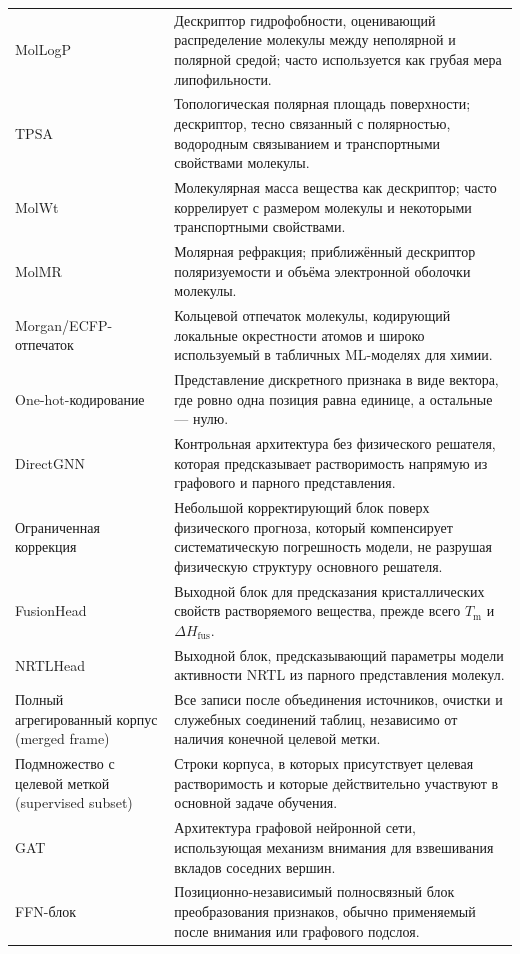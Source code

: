 \documentclass[11pt]{article}
\begin{document}
\begin{longtable}{p{}p{}}
MolLogP & Дескриптор гидрофобности, оценивающий распределение молекулы между неполярной и полярной средой; часто используется как грубая мера липофильности. \\
TPSA & Топологическая полярная площадь поверхности; дескриптор, тесно связанный с полярностью, водородным связыванием и транспортными свойствами молекулы. \\
MolWt & Молекулярная масса вещества как дескриптор; часто коррелирует с размером молекулы и некоторыми транспортными свойствами. \\
MolMR & Молярная рефракция; приближённый дескриптор поляризуемости и объёма электронной оболочки молекулы. \\
Morgan/ECFP-отпечаток & Кольцевой отпечаток молекулы, кодирующий локальные окрестности атомов и широко используемый в табличных ML-моделях для химии. \\
One-hot-кодирование & Представление дискретного признака в виде вектора, где ровно одна позиция равна единице, а остальные --- нулю. \\
DirectGNN & Контрольная архитектура без физического решателя, которая предсказывает растворимость напрямую из графового и парного представления. \\
Ограниченная коррекция & Небольшой корректирующий блок поверх физического прогноза, который компенсирует систематическую погрешность модели, не разрушая физическую структуру основного решателя. \\
FusionHead & Выходной блок для предсказания кристаллических свойств растворяемого вещества, прежде всего $T_{\mathrm{m}}$ и $\Delta H_{\mathrm{fus}}$. \\
NRTLHead & Выходной блок, предсказывающий параметры модели активности NRTL из парного представления молекул. \\
Полный агрегированный корпус (merged frame) & Все записи после объединения источников, очистки и служебных соединений таблиц, независимо от наличия конечной целевой метки. \\
Подмножество с целевой меткой (supervised subset) & Строки корпуса, в которых присутствует целевая растворимость и которые действительно участвуют в основной задаче обучения. \\
GAT & Архитектура графовой нейронной сети, использующая механизм внимания для взвешивания вкладов соседних вершин. \\
FFN-блок & Позиционно-независимый полносвязный блок преобразования признаков, обычно применяемый после внимания или графового подслоя. \\

\end{longtable}
\end{document}
